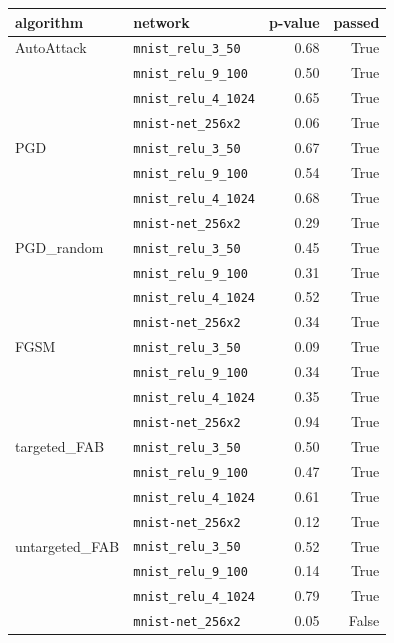 \begin{tabular}{llrr}
\toprule
algorithm & network & p-value & passed \\
\midrule
AutoAttack & \texttt{mnist\_relu\_3\_50} & 0.68 & True \\
 & \texttt{mnist\_relu\_9\_100} & 0.50 & True \\
 & \texttt{mnist\_relu\_4\_1024} & 0.65 & True \\
 & \texttt{mnist-net\_256x2} & 0.06 & True \\
PGD & \texttt{mnist\_relu\_3\_50} & 0.67 & True \\
 & \texttt{mnist\_relu\_9\_100} & 0.54 & True \\
 & \texttt{mnist\_relu\_4\_1024} & 0.68 & True \\
 & \texttt{mnist-net\_256x2} & 0.29 & True \\
PGD\_random & \texttt{mnist\_relu\_3\_50} & 0.45 & True \\
 & \texttt{mnist\_relu\_9\_100} & 0.31 & True \\
 & \texttt{mnist\_relu\_4\_1024} & 0.52 & True \\
 & \texttt{mnist-net\_256x2} & 0.34 & True \\
FGSM & \texttt{mnist\_relu\_3\_50} & 0.09 & True \\
 & \texttt{mnist\_relu\_9\_100} & 0.34 & True \\
 & \texttt{mnist\_relu\_4\_1024} & 0.35 & True \\
 & \texttt{mnist-net\_256x2} & 0.94 & True \\
targeted\_FAB & \texttt{mnist\_relu\_3\_50} & 0.50 & True \\
 & \texttt{mnist\_relu\_9\_100} & 0.47 & True \\
 & \texttt{mnist\_relu\_4\_1024} & 0.61 & True \\
 & \texttt{mnist-net\_256x2} & 0.12 & True \\
untargeted\_FAB & \texttt{mnist\_relu\_3\_50} & 0.52 & True \\
 & \texttt{mnist\_relu\_9\_100} & 0.14 & True \\
 & \texttt{mnist\_relu\_4\_1024} & 0.79 & True \\
 & \texttt{mnist-net\_256x2} & 0.05 & False \\
\bottomrule
\end{tabular}
